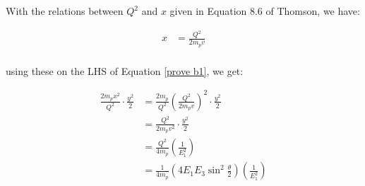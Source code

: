 \documentclass[11pt]{article}
\theoremstyle{definition}
\begin{document}
With the relations between $Q^2$ and $x$ given in Equation 8.6 of Thomson, we have:

\begin{align}
    x &= \frac{Q^2}{2m_pv}\\
\end{align}

using these on the LHS of Equation \ref{prove b1}, we get:

\begin{align}
    \frac{2m_px^2}{Q^2}\cdot \frac{y^2}{2}
    &= \frac{2m_p}{Q^2}\left(\frac{Q^2}{2m_pv}\right)^2\cdot\frac{y^2}{2}\\
    &= \frac{Q^2}{2m_pv^2} \cdot \frac{y^2}{2}\\
    &= \frac{Q^2}{4m_p}  \left(\frac{1}{E_1^2}\right) \\
    &= \frac{1}{4m_p} \left(4E_1E_3\sin^2\frac{\theta}{2}\right)  \left(\frac{1}{E_1^2}\right) \\
\end{align}







\end{document}
